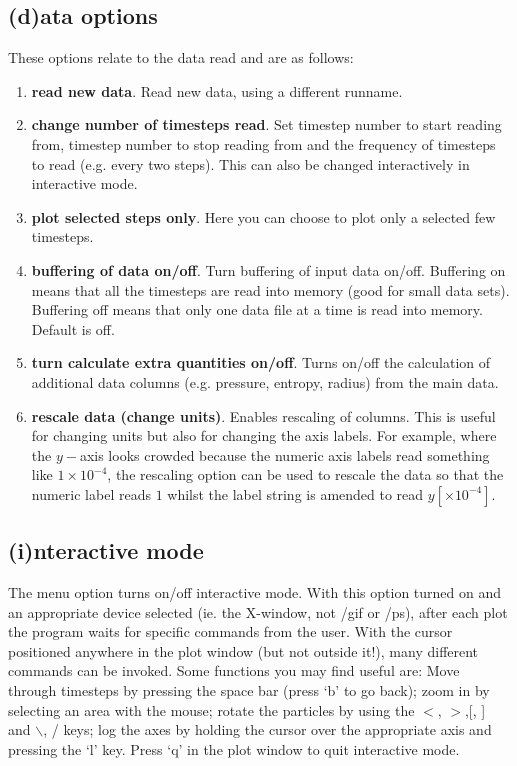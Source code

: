 \documentclass[a4paper,11pt]{article}
\begin{document}
\subsection{(d)ata options}
These options relate to the data read and are as follows:
\begin{enumerate}
\item \textbf{read new data}. Read new data, using a different runname.
\item \textbf{change number of timesteps read}. Set timestep number to start
reading from, timestep number to stop reading from and the frequency of
timesteps to read (e.g. every two steps). This can also be changed interactively in
interactive mode.
\item \textbf{plot selected steps only}. Here you can choose to plot only a selected
few timesteps.
\item \textbf{buffering of data on/off}. Turn buffering of input data on/off.
Buffering on means that all the timesteps are read into memory (good for small
data sets). Buffering off means that only one data file at a time is read into
memory. Default is off.
\item \textbf{turn calculate extra quantities on/off}. Turns on/off the calculation
of additional data columns (e.g. pressure, entropy, radius) from the main data.
\item \textbf{rescale data (change units)}. Enables rescaling of columns. This
is useful for changing units but also for changing the axis labels. For
example, where the $y-$axis looks crowded because the numeric axis labels read something
like $1\times 10^{-4}$, the rescaling option can be used to rescale the data so
that the numeric label reads $1$ whilst the label string is amended to read $y
[\times 10^{-4}]$.
\end{enumerate}

\subsection{(i)nteractive mode}
 The menu option turns on/off interactive mode. With this option turned on and
an appropriate device selected (ie. the X-window, not /gif or /ps), after
each plot the program waits for specific commands from the user. With the cursor
positioned anywhere in the plot window (but not outside it!), many different
commands can be invoked. Some functions you may find useful are: Move through timesteps by pressing the space bar (press
 `b' to go back); zoom in by selecting an area with the mouse; rotate the
particles by using the $<$, $>$,[, ] and $\backslash$, / keys; log the axes by holding the cursor
over the appropriate axis and pressing the `l' key. Press `q' in the plot window
to quit interactive mode.
\end{document}
